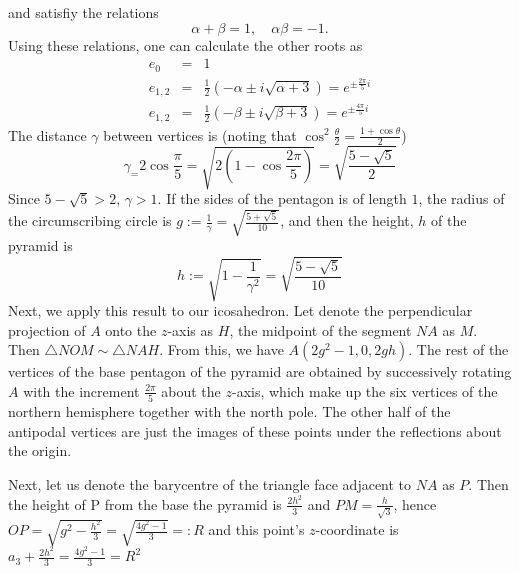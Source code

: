 \documentclass{article}
\begin{document}
and satisfiy the relations
\begin{equation}
\label{}
\alpha + \beta = 1, \quad \alpha  \beta = -1.
\end{equation}
Using these relations, one can calculate the other roots as
\begin{eqnarray}
e_0 & = & 1  \\
e_{1,2} & = & \frac{1}{2}(-\alpha \pm i\sqrt{\alpha + 3}) = e^{\pm\frac{2\pi}{5}i} \\
e_{1,2} & = & \frac{1}{2}(-\beta \pm i\sqrt{\beta + 3}) = e^{\pm\frac{4\pi}{5}i}
\end{eqnarray}
The distance $\gamma$ between vertices is (noting that $\cos^2{\frac{\theta}{2}} = \frac{1+ \cos{\theta}}{2}$)
\begin{equation}
\label{}
\gamma_ = 2\cos{\frac{\pi}{5}} = \sqrt{2\left( 1 - \cos{\frac{2\pi}{5}}\right)} = \sqrt{\frac{5-\sqrt{5}}{2}}
\end{equation}
Since $5-\sqrt{5}>2$, $\gamma >1$. If the sides of the pentagon is of length $1$, the radius of the circumscribing circle is $g:=\frac{1}{\gamma} = \sqrt{\frac{5+\sqrt{5}}{10}}$, and then the height, $h$ of the pyramid is
\begin{equation}
\label{}
h := \sqrt{1-\frac{1}{\gamma^2}} = \sqrt{\frac{5-\sqrt{5}}{10}} 
\end{equation}
Next, we apply this result to our icosahedron. Let denote the perpendicular projection of $A$ onto the $z$-axis as $H$, the midpoint of the segment $NA$ as $M$. Then $\triangle NOM \sim \triangle NAH$. From this, we have $A(2g^2-1, 0, 2gh)$. The rest of the vertices of the base pentagon of the pyramid are obtained by successively rotating $A$ with the increment $\frac{2\pi}{5}$ about the $z$-axis, which make up the six vertices of the northern hemisphere together with the north pole. The other half of the antipodal vertices are just the images of these points under the reflections about the origin.
\par
Next, let us denote the barycentre of the triangle face adjacent to $NA$ as $P$. Then the height of P from the base the pyramid is $\frac{2h^2}{3}$ and $PM = \frac{h}{\sqrt{3}}$, hence $OP = \sqrt{g^2 - \frac{h^2}{3}} = \sqrt{\frac{4g^2-1}{3}} =:R$ and this point's $z$-coordinate is $a_3 + \frac{2h^2}{3} = \frac{4g^2-1}{3}=R^2$
\end{document}
